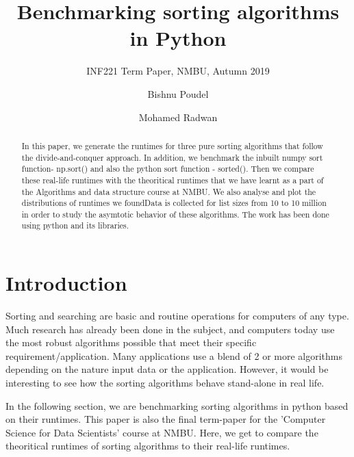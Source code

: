 \documentclass[sigconf, nonacm, natbib, screen, balance=False]{acmart}
\begin{document}
\title{Benchmarking sorting algorithms in Python}
\subtitle{INF221 Term Paper, NMBU, Autumn 2019}

\author{Bishnu Poudel}

\author{Mohamed Radwan}

\begin{abstract}
In this paper, we generate the runtimes for three pure sorting algorithms that follow the divide-and-conquer approach. In addition, we benchmark the inbuilt numpy sort function- np.sort() and also the python sort function - sorted(). 
Then we compare these real-life runtimes with the theoritical runtimes that we have learnt as a part of the Algorithms 
and data structure course at NMBU. We also analyse and plot the distributions of runtimes we foundData is collected for list sizes  from 10 to 10 million in order to study the asymtotic behavior of these algorithms.
The work has been done using python and its libraries.
\end{abstract}


\maketitle

\section{Introduction}\label{sec:intro}


Sorting and searching are basic and routine operations for computers of any type. Much research has already been done in the subject, and computers today use the most robust algorithms possible that meet their specific requirement/application. Many applications use a blend of 2 or more algorithms depending on the nature input data or the application.  However, it would be interesting to see how the  sorting algorithms behave stand-alone  in real life.

In the following section, we are benchmarking sorting algorithms in python based on their runtimes. This paper is also the final 
term-paper for the 'Computer Science for Data Scientists'  course at NMBU. Here, we get to compare the theoritical runtimes of sorting algorithms  to their real-life runtimes.
\end{document}
